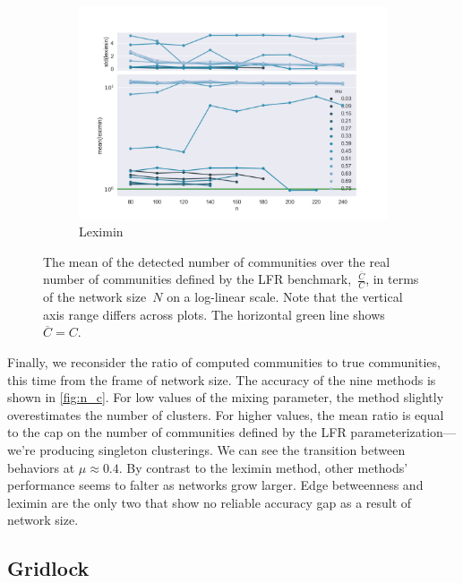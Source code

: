 \begin{figure}
    \begin{subfigure}[b]{0.32\textwidth}
        \includegraphics[width=\textwidth]{fig/ratio_vs_n_leximin}
        \caption{Leximin}
        \label{fig:mouse}
    \end{subfigure}

  \caption{The mean of the detected number of communities over the real number of communities defined by the LFR benchmark,~$\frac{\overline{C}}{C}$, in terms of the network size~$N$ on a log-linear scale. Note that the vertical axis range differs across plots. The horizontal green line shows $\overline{C} = C$.}
  \label{fig:n_c}
\end{figure}

Finally, we reconsider the ratio of computed communities to true communities, this time from the frame of network size. The accuracy of the nine methods is shown in \autoref{fig:n_c}. For low values of the mixing parameter, the method slightly overestimates the number of clusters. For higher values, the mean ratio is equal to the cap on the number of communities defined by the LFR parameterization---we're producing singleton clusterings. We can see the transition between behaviors at $\mu \approx 0.4$. By contrast to the leximin method, other methods' performance seems to falter as networks grow larger. Edge betweenness and leximin are the only two that show no reliable accuracy gap as a result of network size.


\subsection{Gridlock} \label{sec:compare_gridlock}


